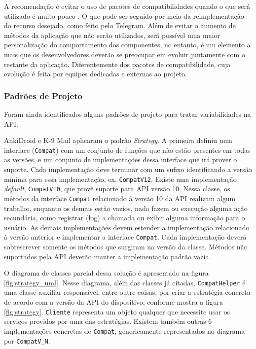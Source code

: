 A recomendação é evitar o uso de pacotes de compatibilidades quando o que será
utilizado é muito pouco \cite{multidex}. O que pode ser seguido por meio da
reimplementação do recurso desejado,
como feito pelo Telegram. Além
de evitar o aumento de métodos da aplicação que não serão utilizados, será possível
uma maior personalização do comportamento dos componentes, no entanto, é um elemento
a mais que os desenvolvedores deverão se preocupar em evoluir juntamente com o restante
da aplicação. Diferentemente dos pacotes de compatibilidade, cuja evolução é feita por
equipes dedicadas e externas ao projeto.

\subsubsection{Padrões de Projeto}
Foram ainda identificados alguns padrões de projeto para tratar variabilidades na API.

AnkiDroid e K-9 Mail aplicaram o padrão \textit{Strategy}. A primeira definiu uma
interface (\texttt{Compat}) com um conjunto de funções que não estão presentes em
todas as versões, e um conjunto de implementações dessa interface que irá prover
o suporte. Cada implementação deve terminar com um sufixo identificando a versão
mínima para essa implementação, ex. \texttt{CompatV12}. Existe uma implementação
\textit{default}, \texttt{CompatV10}, que provê suporte para API versão 10.
Nessa classe, os métodos da interface \texttt{Compat} relacionado à versão 10
da API realizam algum trabalho, enquanto os demais estão vazios, nada fazem ou
execução alguma ação secundária, como registrar (log) a chamada ou exibir alguma
informação para o usuário. As demais implementações
devem estender a implementação relacionado à versão anterior e implementar a
interface \texttt{Compat}. Cada implementação deverá sobrescrever somente os
métodos que surgiram na versão da classe. Métodos não suportados pela API
deverão manter a implementação padrão vazia.

O diagrama de classes parcial dessa
solução é apresentado na figura \ref{fig:strategy_uml}. Nesse diagrama, além
das classes já citadas, \texttt{CompatHelper} é uma classe auxiliar responsável,
entre outre coisas, por criar a estratégia concreta de acordo com a versão da API
do dispositivo, conforme mostra a figura \ref{fig:strategy}. \texttt{Cliente} representa um objeto qualquer
que necessite usar os serviços providos por uma das estratégias. Existem também outras
6 implementações concretas de \texttt{Compat}, genericamente representados no diagrama por
\texttt{CompatV\_N}.

